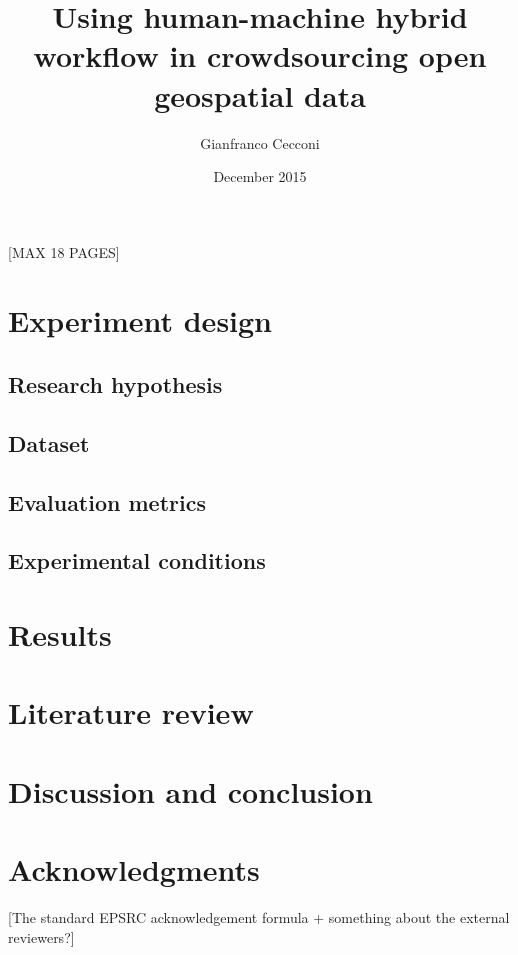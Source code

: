 \documentclass{llncs}
\title{Using human-machine hybrid workflow in crowdsourcing open geospatial data}
\author{Gianfranco Cecconi}
\institute{University of Southampton \email{gc1a13@soton.ac.uk}}
\date{December 2015}
\begin{document}
\maketitle

[MAX 18 PAGES]




\section{Experiment design}

\subsection{Research hypothesis}
\subsection{Dataset}
\subsection{Evaluation metrics}
\subsection{Experimental conditions}

\section{Results}

\section{Literature review}

\section{Discussion and conclusion}

\section*{Acknowledgments}

{[}The standard EPSRC acknowledgement formula + something about the external reviewers?{]}


\end{document}
